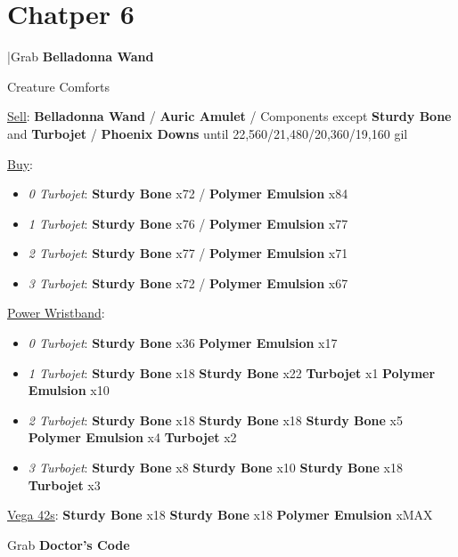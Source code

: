 \section{Chatper 6}
\begin{mainlist}
	\item \skip|Grab \textbf{Belladonna Wand}
\end{mainlist}
\begin{shop}{Creature Comforts}
	\item \underline{Sell}: \textbf{Belladonna Wand} / \textbf{Auric Amulet} / Components except \textbf{Sturdy Bone} and \textbf{Turbojet} / \textbf{Phoenix Downs} until 22,560/21,480/20,360/19,160 gil
	\item \underline{Buy}:
	\begin{itemize}
		\item \textit{0 Turbojet}: \textbf{Sturdy Bone} x72 / \textbf{Polymer Emulsion} x84
		\item \textit{1 Turbojet}: \textbf{Sturdy Bone} x76 / \textbf{Polymer Emulsion} x77
		\item \textit{2 Turbojet}: \textbf{Sturdy Bone} x77 / \textbf{Polymer Emulsion} x71
		\item \textit{3 Turbojet}: \textbf{Sturdy Bone} x72 / \textbf{Polymer Emulsion} x67
	\end{itemize}
\end{shop}
\begin{upgrade}
	\item \underline{Power Wristband}:
	\begin{itemize}
		\item \textit{0 Turbojet}: \textbf{Sturdy Bone} x36 \to \textbf{Polymer Emulsion} x17
		\item \textit{1 Turbojet}: \textbf{Sturdy Bone} x18 \to \textbf{Sturdy Bone} x22 \to \textbf{Turbojet} x1 \to \textbf{Polymer Emulsion} x10
		\item \textit{2 Turbojet}: \textbf{Sturdy Bone} x18 \to \textbf{Sturdy Bone} x18 \to \textbf{Sturdy Bone} x5 \to \textbf{Polymer Emulsion} x4 \to \textbf{Turbojet} x2
		\item \textit{3 Turbojet}: \textbf{Sturdy Bone} x8 \to \textbf{Sturdy Bone} x10 \to \textbf{Sturdy Bone} x18 \to \textbf{Turbojet} x3
	\end{itemize}
	\item \underline{Vega 42s}: \textbf{Sturdy Bone} x18 \to \textbf{Sturdy Bone} x18 \to \textbf{Polymer Emulsion} xMAX
\end{upgrade}
\begin{mainlist}
	\item Grab \textbf{Doctor's Code}
\end{mainlist}
